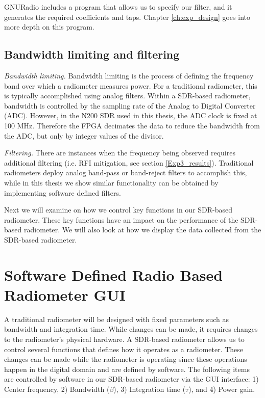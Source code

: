 GNURadio includes a program that allows us to specify our filter, and it generates the required coefficients and taps.  Chapter \ref{ch:exp_design} goes into more depth on this program.

\subsection{Bandwidth limiting and filtering}

\emph{Bandwidth limiting.}  Bandwidth limiting is the process of defining the frequency band over which a radiometer measures power.  For a traditional radiometer, this is typically accomplished using analog filters.  Within a SDR-based radiometer, bandwidth is controlled by the sampling rate of the Analog to Digital Converter (ADC).  However, in the N200 SDR used in this thesis, the ADC clock is fixed at 100 MHz.  Therefore the FPGA decimates the data to reduce the bandwidth from the ADC, but only by integer values of the divisor.

\emph{Filtering.}  There are instances when the frequency being observed requires additional filtering (i.e. RFI mitigation, see section \ref{Exp3_results}).  Traditional radiometers deploy analog band-pass or band-reject filters to accomplish this, while in this thesis we show similar functionality can be obtained by implementing software defined filters.

Next we will examine on how we control key functions in our SDR-based radiometer.  These key functions have an impact on the performance of the SDR-based radiometer.  We will also look at how we display the data collected from the SDR-based radiometer.

\section{Software Defined Radio Based Radiometer GUI}

A traditional radiometer will be designed with fixed parameters such as bandwidth and integration time.  While changes can be made, it requires changes to the radiometer's physical hardware.  A SDR-based radiometer allows us to control several functions that defines how it operates as a radiometer.  These changes can be made while the radiometer is operating since these operations happen in the digital domain and are defined by software. The following items are controlled by software in our SDR-based radiometer via the GUI interface: 1) Center frequency, 2) Bandwidth ($\beta$), 3) Integration time ($\tau$), and 4) Power gain.

